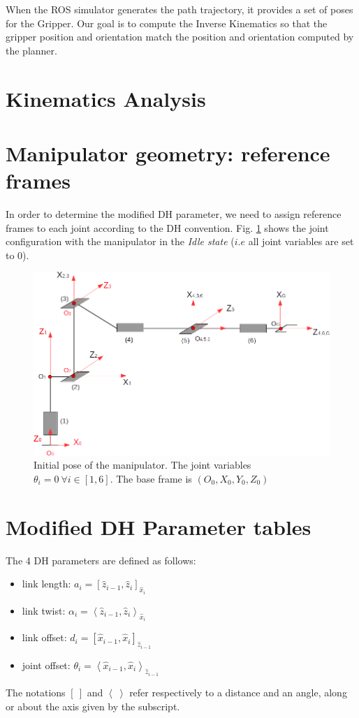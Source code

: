 \documentclass[a4paper,12pt]{report}
\begin{document}
When the ROS simulator generates the path trajectory, it provides a set of poses for the Gripper. Our goal is to compute the Inverse Kinematics so that the gripper position and orientation match the position and orientation computed by the planner.

\section{Kinematics Analysis}

\section{Manipulator geometry: reference frames}
In order to determine the modified DH parameter, we need to assign reference frames to each joint according to the DH convention. Fig. \ref{fig:idle_state} shows the joint configuration with the manipulator in the \textit{Idle state} ($i.e$ all joint variables are set to 0).

\begin{figure}[H]
\centering
        \includegraphics[totalheight=12cm]{imgs/idle_state.png}
        \caption{Initial pose of the manipulator. The joint variables $\theta_i = 0 \ \forall i \in [1, 6]$. The base frame is $(O_0, X_0, Y_0, Z_0)$}
\label{fig:idle_state}
\end{figure}


\section{Modified DH Parameter tables}
The 4 DH parameters are defined as follows:
\begin{itemize}
\item link length: $a_i = [\hat{z}_{i-1}, \hat{z}_i]_{\hat{x}_i}$
\item link twist: $\alpha_i = \left< \hat{z}_{i-1}, \hat{z}_i \right> _{\hat{x}_i}$
\item link offset: $d_i = [\hat{x}_{i-1}, \hat{x}_i]_{\hat{z}_{i-1}}$ 
\item joint offset: $\theta_i = \left< \hat{x}_{i-1}, \hat{x}_i \right> _{\hat{z}_{i-1}}$
\end{itemize}
The notations $[ \ ]$ and $\left< \ \right>$ refer respectively to a distance and an angle, along or about the axis given by the subscript. 
\end{document}
